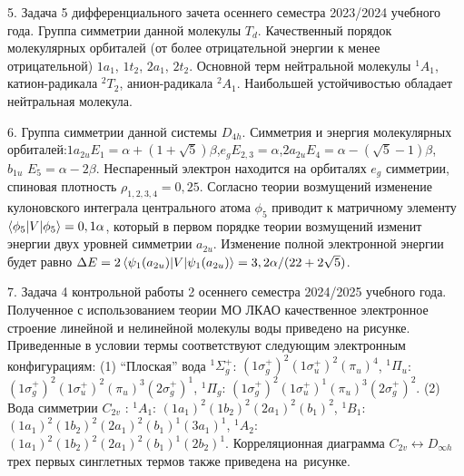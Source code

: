 5. Задача 5 дифференциального зачета осеннего семестра 2023/2024 учебного года. Группа симметрии данной молекулы $T_{d}$. Качественный порядок молекулярных орбиталей (от более отрицательной энергии к менее отрицательной) $1a_1$, $1t_2$, $2a_1$, $2t_2$. Основной терм нейтральной молекулы $^1A_1$, катион-радикала $^2T_2$, анион-радикала $^2A_1$. Наибольшей устойчивостью обладает нейтральная молекула.\par
6. Группа симметрии данной системы $D_{4h}$. Симметрия и энергия молекулярных орбиталей:\hspace{\fill}$1a_{2u}$\hspace{\fill}$E_1=\alpha+(1+\sqrt5)\beta$,\hspace{\fill}$e_g$\hspace{\fill}$E_{2,3}=\alpha$,\hspace{\fill}$2a_{2u}$\hspace{\fill}$E_4=\alpha-(\sqrt5-1)\beta$,\\ $b_{1u}$ $E_5=\alpha-2\beta$. Неспаренный электрон находится на орбиталях $e_g$ симметрии, спиновая плотность $\rho_{1,2,3,4}=0,25$. Согласно теории возмущений изменение кулоновского интеграла центрального атома $\phi_5$ приводит к матричному элементу $\braket{\phi_5|V|\phi_5}=0,1\alpha$, который в первом порядке теории возмущений изменит энергии двух уровней симметрии $a_{2u}$. Изменение полной электронной энергии будет равно $\Delta E=2\braket{\psi_1(a_{2u})|V|\psi_1(a_{2u})}=3,2\alpha/(22+2\sqrt5)$.\par
7. Задача 4 контрольной работы 2 осеннего семестра 2024/2025 учебного года. Полученное с использованием теории МО ЛКАО качественное электронное строение линейной и нелинейной молекулы воды приведено на рисунке. Приведенные в условии термы соответствуют следующим электронным конфигурациям: (1) “Плоская” вода $^1\Sigma_g^+$: $(1\sigma_g^+)^2 (1\sigma_u^+)^2 (\pi_u)^4$, $^1\Pi_u$: $(1\sigma_g^+)^2 (1\sigma_u^+ )^2 (\pi_u )^3 (2\sigma_g^+ )^1$, $^1\Pi_g$: $(1\sigma_g^+)^2 (1\sigma_u^+)^1 (\pi_u )^3 (2\sigma_g^+ )^2$. (2) Вода симметрии $C_{2v}$ : $^1A_1$: $(1a_1 )^2 (1b_2 )^2 (2a_1 )^2 (b_1 )^2$, $^1B_1$: $(1a_1 )^2 (1b_2 )^2 (2a_1 )^2 (b_1 )^1  (3a_1  )^1$, $^1A_2$: $(1a_1 )^2 (1b_2 )^2 (2a_1 )^2 (b_1 )^1 (2b_2)^1$. Корреляционная диаграмма $C_{2v} \leftrightarrow D_{\infty h}$ трех первых синглетных термов также приведена на~рисунке.
\vspace{-\parskip}
\vspace{5mm}
